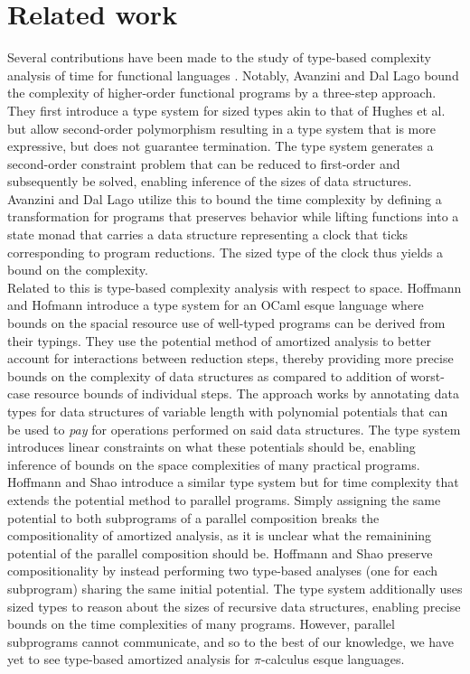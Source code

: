 
\section{Related work}\label{sec:relatedwork}
%
Several contributions have been made to the study of type-based complexity analysis of time for functional languages \cite{DalLago2009,AvanziniLago2017,DalLagoGaboardi2011}. Notably, Avanzini and Dal Lago \cite{AvanziniLago2017} bound the complexity of higher-order functional programs by a three-step approach. They first introduce a type system for sized types akin to that of Hughes et al. \cite{HughesEtAl1996} but allow second-order polymorphism resulting in a type system that is more expressive, but does not guarantee termination. The type system generates a second-order constraint problem that can be reduced to first-order and subsequently be solved, enabling inference of the sizes of data structures. Avanzini and Dal Lago utilize this to bound the time complexity by defining a transformation for programs that preserves behavior while lifting functions into a state monad that carries a data structure representing a clock that ticks corresponding to program reductions. The sized type of the clock thus yields a bound on the complexity.\\

Related to this is type-based complexity analysis with respect to space. Hoffmann and Hofmann \cite{Hoffmann2010} introduce a type system for an OCaml esque language where bounds on the spacial resource use of well-typed programs can be derived from their typings. They use the potential method of amortized analysis to better account for interactions between reduction steps, thereby providing more precise bounds on the complexity of data structures as compared to addition of worst-case resource bounds of individual steps. The approach works by annotating data types for data structures of variable length with polynomial potentials that can be used to \textit{pay} for operations performed on said data structures. The type system introduces linear constraints on what these potentials should be, enabling inference of bounds on the space complexities of many practical programs.\\

Hoffmann and Shao \cite{HoffmannShao2015} introduce a similar type system but for time complexity that extends the potential method to parallel programs. Simply assigning the same potential to both subprograms of a parallel composition breaks the compositionality of amortized analysis, as it is unclear what the remainining potential of the parallel composition should be. Hoffmann and Shao preserve compositionality by instead performing two type-based analyses (one for each subprogram) sharing the same initial potential. The type system additionally uses sized types to reason about the sizes of recursive data structures, enabling precise bounds on the time complexities of many programs. However, parallel subprograms cannot communicate, and so to the best of our knowledge, we have yet to see type-based amortized analysis for $\pi$-calculus esque languages.\\

